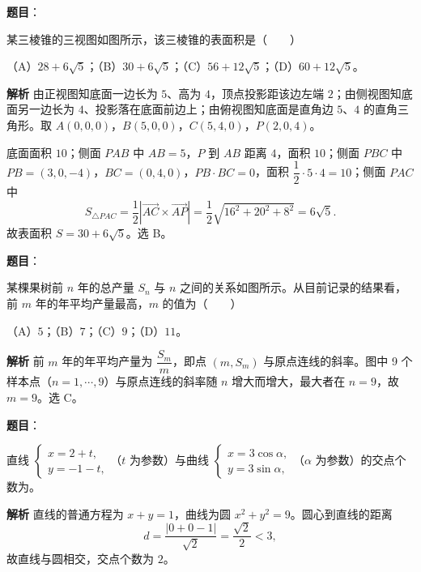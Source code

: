 \begin{answer}

\textbf{题目}：

某三棱锥的三视图如图所示，该三棱锥的表面积是\mbox{（　　）}
\nopagebreak[4]
\begin{center}\end{center}
\nopagebreak[4]
（A）$28+6\sqrt5$；（B）$30+6\sqrt5$；（C）$56+12\sqrt5$；（D）$60+12\sqrt5$。

\textbf{解析}
由正视图知底面一边长为 $5$、高为 $4$，顶点投影距该边左端 $2$；由侧视图知底面另一边长为 $4$、投影落在底面前边上；由俯视图知底面是直角边 $5$、$4$ 的直角三角形。取 $A(0,0,0)$，$B(5,0,0)$，$C(5,4,0)$，$P(2,0,4)$。

底面面积 $10$；侧面 $PAB$ 中 $AB=5$，$P$ 到 $AB$ 距离 $4$，面积 $10$；侧面 $PBC$ 中 $PB=(3,0,-4)$，$BC=(0,4,0)$，$PB\cdot BC=0$，面积 $\dfrac12\cdot5\cdot4=10$；侧面 $PAC$ 中
\nopagebreak[4]
\[S_{\triangle PAC}=\frac12\left|\overrightarrow{AC}\times\overrightarrow{AP}\right|=\frac12\sqrt{16^2+20^2+8^2}=6\sqrt5.\]
故表面积 $S=30+6\sqrt5$。选 B。


\end{answer}
\begin{answer}

\textbf{题目}：

某棵果树前 $n$ 年的总产量 $S_n$ 与 $n$ 之间的关系如图所示。从目前记录的结果看，前 $m$ 年的年平均产量最高，$m$ 的值为\mbox{（　　）}
\nopagebreak[4]
\begin{center}\end{center}
\nopagebreak[4]
（A）$5$；（B）$7$；（C）$9$；（D）$11$。

\textbf{解析}
前 $m$ 年的年平均产量为 $\dfrac{S_m}m$，即点 $(m,S_m)$ 与原点连线的斜率。图中 9 个样本点（$n=1,\cdots,9$）与原点连线的斜率随 $n$ 增大而增大，最大者在 $n=9$，故 $m=9$。选 C。


\end{answer}
\begin{answer}

\textbf{题目}：

直线 $\begin{cases}x=2+t,\\y=-1-t,\end{cases}$（$t$ 为参数）与曲线 $\begin{cases}x=3\cos\alpha,\\y=3\sin\alpha,\end{cases}$（$\alpha$ 为参数）的交点个数为\gkblank{}。

\textbf{解析}
直线的普通方程为 $x+y=1$，曲线为圆 $x^2+y^2=9$。圆心到直线的距离
\nopagebreak[4]
\[d=\frac{|0+0-1|}{\sqrt2}=\frac{\sqrt2}2<3,\]
故直线与圆相交，交点个数为 $2$。


\end{answer}

